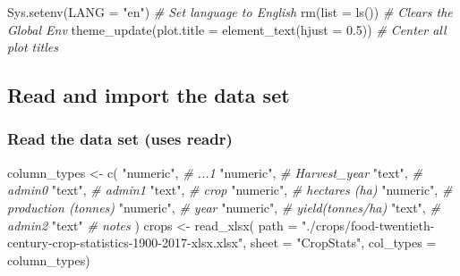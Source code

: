 \documentclass[
]{article}
\newenvironment{Shaded}{\begin{snugshade}}{\end{snugshade}}
\newcommand{\AttributeTok}[1]{\textcolor[rgb]{0.77,0.63,0.00}{#1}}
\newcommand{\CommentTok}[1]{\textcolor[rgb]{0.56,0.35,0.01}{\textit{#1}}}
\newcommand{\FloatTok}[1]{\textcolor[rgb]{0.00,0.00,0.81}{#1}}
\newcommand{\FunctionTok}[1]{\textcolor[rgb]{0.00,0.00,0.00}{#1}}
\newcommand{\NormalTok}[1]{#1}
\newcommand{\OtherTok}[1]{\textcolor[rgb]{0.56,0.35,0.01}{#1}}
\newcommand{\StringTok}[1]{\textcolor[rgb]{0.31,0.60,0.02}{#1}}
\begin{document}
\begin{Shaded}
\begin{Highlighting}[]
\FunctionTok{Sys.setenv}\NormalTok{(}\AttributeTok{LANG =} \StringTok{"en"}\NormalTok{) }\CommentTok{\# Set language to English}
\FunctionTok{rm}\NormalTok{(}\AttributeTok{list =} \FunctionTok{ls}\NormalTok{()) }\CommentTok{\# Clears the Global Env}
\FunctionTok{theme\_update}\NormalTok{(}\AttributeTok{plot.title =} \FunctionTok{element\_text}\NormalTok{(}\AttributeTok{hjust =} \FloatTok{0.5}\NormalTok{)) }\CommentTok{\# Center all plot titles}
\end{Highlighting}
\end{Shaded}

\hypertarget{read-and-import-the-data-set}{%
\subsection{Read and import the data
set}\label{read-and-import-the-data-set}}

\hypertarget{read-the-data-set-uses-readr}{%
\subsubsection{Read the data set (uses
readr)}\label{read-the-data-set-uses-readr}}

\begin{Shaded}
\begin{Highlighting}[]
\NormalTok{column\_types }\OtherTok{\textless{}{-}} \FunctionTok{c}\NormalTok{(}
  \StringTok{"numeric"}\NormalTok{, }\CommentTok{\# ...1}
  \StringTok{"numeric"}\NormalTok{, }\CommentTok{\# Harvest\_year}
  \StringTok{"text"}\NormalTok{,    }\CommentTok{\# admin0}
  \StringTok{"text"}\NormalTok{,    }\CommentTok{\# admin1}
  \StringTok{"text"}\NormalTok{,    }\CommentTok{\# crop}
  \StringTok{"numeric"}\NormalTok{, }\CommentTok{\# hectares (ha)}
  \StringTok{"numeric"}\NormalTok{, }\CommentTok{\# production (tonnes)}
  \StringTok{"numeric"}\NormalTok{, }\CommentTok{\# year}
  \StringTok{"numeric"}\NormalTok{, }\CommentTok{\# yield(tonnes/ha)}
  \StringTok{"text"}\NormalTok{,    }\CommentTok{\# admin2}
  \StringTok{"text"}     \CommentTok{\# notes}
\NormalTok{)}
\NormalTok{crops }\OtherTok{\textless{}{-}} \FunctionTok{read\_xlsx}\NormalTok{(}
  \AttributeTok{path =} \StringTok{"./crops/food{-}twentieth{-}century{-}crop{-}statistics{-}1900{-}2017{-}xlsx.xlsx"}\NormalTok{,}
  \AttributeTok{sheet =} \StringTok{"CropStats"}\NormalTok{,}
  \AttributeTok{col\_types =}\NormalTok{ column\_types)}
\end{Highlighting}
\end{Shaded}
\end{document}

